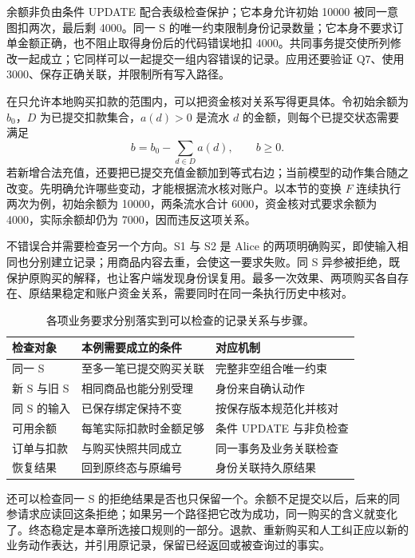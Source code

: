 余额非负由条件 UPDATE 配合表级检查保护；它本身允许初始 10000 被同一意图扣两次，最后剩 4000。同一 S 的唯一约束限制身份记录数量；它本身不要求订单金额正确，也不阻止取得身份后的代码错误地扣 4000。共同事务提交使所列修改一起成立；它同样可以一起提交一组内容错误的记录。应用还要验证 Q7、使用 3000、保存正确关联，并限制所有写入路径。

在只允许本地购买扣款的范围内，可以把资金核对关系写得更具体。令初始余额为 \(b_0\)，\(D\) 为已提交扣款集合，\(a(d)>0\) 是流水 \(d\) 的金额，则每个已提交状态需要满足
\[
 b=b_0-\sum_{d\in D}a(d),\qquad b\geq 0.
\]
若新增合法充值，还要把已提交充值金额加到等式右边；当前模型的动作集合随之改变。先明确允许哪些变动，才能根据流水核对账户。以本节的变换 $F$ 连续执行两次为例，初始余额为 10000，两条流水合计 6000，资金核对式要求余额为 4000，实际余额却仍为 7000，因而违反这项关系。

不错误合并需要检查另一个方向。S1 与 S2 是 Alice 的两项明确购买，即使输入相同也分别建立记录；用商品内容去重，会使这一要求失败。同 S 异参被拒绝，既保护原购买的解释，也让客户端发现身份误复用。最多一次效果、两项购买各自存在、原结果稳定和账户资金关系，需要同时在同一条执行历史中核对。



\begin{table}[htbp]
\centering\small
\begin{tabularx}{\linewidth}{@{}p{2cm}XX@{}}
\toprule
检查对象 & 本例需要成立的条件 & 对应机制\\
\midrule
同一 S & 至多一笔已提交购买关联 & 完整非空组合唯一约束\\
新 S 与旧 S & 相同商品也能分别受理 & 身份来自确认动作\\
同 S 的输入 & 已保存绑定保持不变 & 按保存版本规范化并核对\\
可用余额 & 每笔实际扣款时金额足够 & 条件 UPDATE 与非负检查\\
订单与扣款 & 与购买快照共同成立 & 同一事务及业务关联检查\\
恢复结果 & 回到原终态与原编号 & 身份关联持久原结果\\
\bottomrule
\end{tabularx}
\caption{各项业务要求分别落实到可以检查的记录关系与步骤。}
\end{table}

还可以检查同一 S 的拒绝结果是否也只保留一个。余额不足提交以后，后来的同参请求应读回这条拒绝；如果另一个路径把它改为成功，同一购买的含义就变化了。终态稳定是本章所选接口规则的一部分。退款、重新购买和人工纠正应以新的业务动作表达，并引用原记录，保留已经返回或被查询过的事实。

